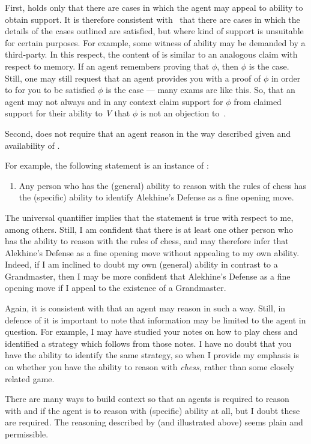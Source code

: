 \begin{note}
  First, \eA{} holds only that there are cases in which the agent may appeal to ability to obtain support.
  It is therefore consistent with~\eA{} that there are cases in which the details of the cases outlined are satisfied, but where kind of support is unsuitable for certain purposes.
  For example, some witness of ability may be demanded by a third-party.
  In this respect, the content of \eA{} is similar to an analogous claim with respect to memory.
  If an agent remembers proving that \(\phi\), then \(\phi\) is the case.
  Still, one may still request that an agent provides you with a proof of \(\phi\) in order to for you to be satisfied \(\phi\) is the case --- many exams are like this.
  So, that an agent may not always and in any context claim support for \(\phi\) from claimed support for their ability to \emph{V} that \(\phi\) is not an objection to~\eA{}.
\end{note}

\begin{note}
  Second, \eA{} does not require that an agent reason in the way described given \gsi{} and availability of .

  For example, the following statement is an instance of \gsi{}:
  \begin{enumerate}
  \item Any person who has the (general) ability to reason with the rules of chess has the (specific) ability to identify Alekhine's Defense as a fine opening move.
  \end{enumerate}
  The universal quantifier implies that the statement is true with respect to me, among others.
  Still, I am confident that there is at least one other person who has the ability to reason with the rules of chess, and may therefore infer that Alekhine's Defense as a fine opening move without appealing to my own ability.
  Indeed, if I am inclined to doubt my own (general) ability in contrast to a Grandmaster, then I may be more confident that Alekhine's Defense as a fine opening move if I appeal to the existence of a Grandmaster.

  Again, it is consistent with \eA{} that an agent may reason in such a way.
  Still, in defence of \eA{} it is important to note that \gsi{} information may be limited to the agent in question.
  For example, I may have studied your notes on how to play chess and identified a strategy which follows from those notes.
  I have no doubt that you have the ability to identify the same strategy, so when I provide \gsi{} my emphasis is on whether you have the ability to reason with \emph{chess}, rather than some closely related game.

  There are many ways to build context so that an agents is required to reason with \gsi{} and  if the agent is to reason with (specific) ability at all, but I doubt these are required.
  The reasoning described by \eA{} (and illustrated above) seems plain and permissible.
\end{note}

